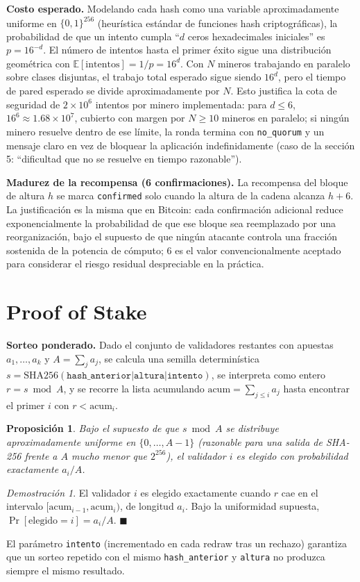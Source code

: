 \documentclass[11pt]{article}
\newtheorem{prop}{Proposición}
\theoremstyle{remark}
\newtheorem*{proof*}{Demostración}
\begin{document}
\textbf{Costo esperado.} Modelando cada hash como una variable aproximadamente uniforme en $\{0,1\}^{256}$ (heurística
estándar de funciones hash criptográficas), la probabilidad de que un intento cumpla ``$d$ ceros hexadecimales iniciales''
es $p=16^{-d}$. El número de intentos hasta el primer éxito sigue una distribución geométrica con
$\mathbb{E}[\text{intentos}]=1/p=16^{d}$. Con $N$ mineros trabajando en paralelo sobre clases disjuntas, el trabajo total
esperado sigue siendo $16^d$, pero el tiempo de pared esperado se divide aproximadamente por $N$. Esto justifica la cota de
seguridad de $2\times 10^6$ intentos por minero implementada: para $d\le 6$, $16^6\approx 1.68\times10^7$, cubierto con
margen por $N\ge 10$ mineros en paralelo; si ningún minero resuelve dentro de ese límite, la ronda termina con
\texttt{no\_quorum} y un mensaje claro en vez de bloquear la aplicación indefinidamente (caso de la sección 5: ``dificultad
que no se resuelve en tiempo razonable'').

\textbf{Madurez de la recompensa (6 confirmaciones).} La recompensa del bloque de altura $h$ se marca \texttt{confirmed}
solo cuando la altura de la cadena alcanza $h+6$. La justificación es la misma que en Bitcoin: cada confirmación adicional
reduce exponencialmente la probabilidad de que ese bloque sea reemplazado por una reorganización, bajo el supuesto de que
ningún atacante controla una fracción sostenida de la potencia de cómputo; 6 es el valor convencionalmente aceptado para
considerar el riesgo residual despreciable en la práctica.

\section{Proof of Stake}
\textbf{Sorteo ponderado.} Dado el conjunto de validadores restantes con apuestas $a_1,\dots,a_k$ y $A=\sum_j a_j$, se
calcula una semilla determinística $s=\mathrm{SHA256}(\texttt{hash\_anterior|altura|intento})$, se interpreta como entero
$r = s \bmod A$, y se recorre la lista acumulando $\mathrm{acum}=\sum_{j\le i} a_j$ hasta encontrar el primer $i$ con
$r<\mathrm{acum}_i$.

\begin{prop}
Bajo el supuesto de que $s \bmod A$ se distribuye aproximadamente uniforme en $\{0,\dots,A-1\}$ (razonable para una salida
de SHA-256 frente a $A$ mucho menor que $2^{256}$), el validador $i$ es elegido con probabilidad exactamente
$a_i/A$.
\end{prop}
\begin{proof*}
El validador $i$ es elegido exactamente cuando $r$ cae en el intervalo $[\mathrm{acum}_{i-1},\mathrm{acum}_i)$, de longitud
$a_i$. Bajo la uniformidad supuesta, $\Pr[\text{elegido}=i]=a_i/A$. $\blacksquare$
\end{proof*}
El parámetro \texttt{intento} (incrementado en cada redraw tras un rechazo) garantiza que un sorteo repetido con el mismo
\texttt{hash\_anterior} y \texttt{altura} no produzca siempre el mismo resultado.
\end{document}
